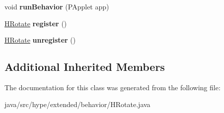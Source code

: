 \begin{DoxyCompactItemize}
\item 
\hypertarget{classhype_1_1extended_1_1behavior_1_1_h_rotate_a7bd0dd5d6f8df2102688990c6b6a0d66}{void {\bfseries run\-Behavior} (P\-Applet app)}\label{classhype_1_1extended_1_1behavior_1_1_h_rotate_a7bd0dd5d6f8df2102688990c6b6a0d66}

\item 
\hypertarget{classhype_1_1extended_1_1behavior_1_1_h_rotate_abb6dc9a915399ed7f35cdefdb99a9704}{\hyperlink{classhype_1_1extended_1_1behavior_1_1_h_rotate}{H\-Rotate} {\bfseries register} ()}\label{classhype_1_1extended_1_1behavior_1_1_h_rotate_abb6dc9a915399ed7f35cdefdb99a9704}

\item 
\hypertarget{classhype_1_1extended_1_1behavior_1_1_h_rotate_ad6085e1cadbbd404ac3135a0e334e7ea}{\hyperlink{classhype_1_1extended_1_1behavior_1_1_h_rotate}{H\-Rotate} {\bfseries unregister} ()}\label{classhype_1_1extended_1_1behavior_1_1_h_rotate_ad6085e1cadbbd404ac3135a0e334e7ea}

\end{DoxyCompactItemize}
\subsection*{Additional Inherited Members}


The documentation for this class was generated from the following file\-:\begin{DoxyCompactItemize}
\item 
java/src/hype/extended/behavior/H\-Rotate.\-java\end{DoxyCompactItemize}
